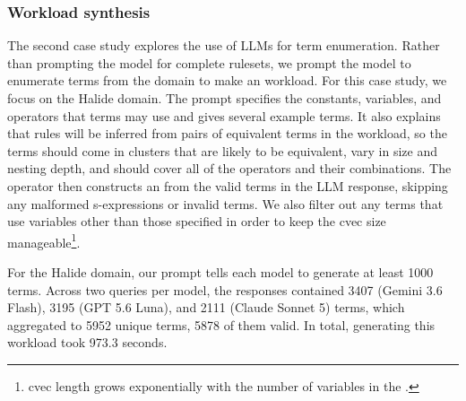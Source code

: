 \begin{table}[ht]
    \caption{Derivability matrices for our LLM rule synthesis case study.
    Halide (Top), Exponential (Left), and Trigonometric (Right).
    Derivability times in seconds are shown in parentheses.
    Reprompted rulesets show only the second round synthesis times
    (marked with $^{+}$) and do not include the first
    round's synthesis time.
    Cell values show the \lhsandrhs derivability results of using the
    row ruleset to derive the column ruleset.
    For Exponential and Trigonometric, the row ruleset is extended with
     or  before deriving, as in \autoref{table:herbie}.
    A dash marks cells where the column ruleset is contained in the row ruleset,
    so derivability holds by construction.
    Derivability between LLM rulesets is not included because
    the goal is not to compare LLM-synthesized rulesets against each other.
    }
    \label{table:llm1}
\end{table}

\subsubsection{Workload synthesis}
\label{subsec:case-study-workload}
The second case study explores the use of LLMs for term enumeration.
Rather than prompting the model for complete rulesets, we prompt the model
  to enumerate terms from the domain to make an \enumo workload.
For this case study, we focus on the Halide domain.
The prompt specifies the constants, variables, and operators that terms may use
  and gives several example terms.
It also explains that
  rules will be inferred from pairs of equivalent terms in the workload,
  so the terms should come in clusters that are likely to be equivalent,
  vary in size and nesting depth, and should cover all of the operators and their combinations.
The \enumo {} operator then constructs an \enumo {}
  from the valid terms in the LLM response,
  skipping any malformed s-expressions
  or invalid terms.
We also filter out any terms that use variables other than those specified
  in order to keep the cvec size manageable\footnote{cvec length grows exponentially
   with the number of variables in the .}.

For the Halide domain,
  our prompt tells each model to generate at least 1000 terms.
Across two queries per model, the responses contained
  3407 (Gemini 3.6 Flash), 3195 (GPT 5.6 Luna), and 2111 (Claude Sonnet 5) terms,
  which aggregated to 5952 unique terms, 5878 of them valid.
In total, generating this workload took 973.3 seconds.

